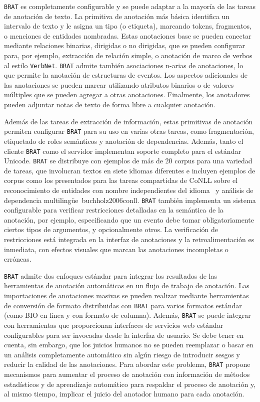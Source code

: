 \texttt{BRAT} es completamente configurable y se puede adaptar a la mayoría de las tareas de anotación de texto.
La primitiva de anotación más básica identifica un intervalo de texto y le asigna un tipo (o etiqueta), marcando tokens, fragmentos, o menciones de entidades nombradas.
Estas anotaciones base se pueden conectar mediante relaciones binarias, dirigidas o no dirigidas, que se pueden configurar para, por ejemplo, extracción de relación simple, o anotación de marco de verbos al estilo \texttt{VerbNet}.
\texttt{BRAT} admite también asociaciones n-arias de anotaciones, lo que permite la anotación de estructuras de eventos.
Los aspectos adicionales de las anotaciones se pueden marcar utilizando atributos binarios o de valores múltiples que se pueden agregar a otras anotaciones.
Finalmente, los anotadores pueden adjuntar notas de texto de forma libre a cualquier anotación.

Además de las tareas de extracción de información, estas primitivas de anotación permiten configurar \texttt{BRAT} para su uso en varias otras tareas, como fragmentación, etiquetado de roles semánticos y anotación de dependencias.
Además, tanto el cliente \texttt{BRAT} como el servidor implementan soporte completo para el estándar Unicode.
\texttt{BRAT} se distribuye con ejemplos de más de 20 corpus para una variedad de tareas, que involucran textos en siete idiomas diferentes e incluyen ejemplos de corpus como los presentados para las tareas compartidas de CoNLL sobre el reconocimiento de entidades con nombre independientes del idioma~\cite{sang2003ef} y análisis de dependencia multilingüe~{buchholz2006conll}.
\texttt{BRAT} también implementa un sistema configurable para verificar restricciones detalladas en la semántica de la anotación, por ejemplo, especificando que un evento debe tomar obligatoriamente ciertos tipos de argumentos, y opcionalmente otros.
La verificación de restricciones está integrada en la interfaz de anotaciones y la retroalimentación es inmediata, con efectos visuales que marcan las anotaciones incompletas o erróneas.

\texttt{BRAT} admite dos enfoques estándar para integrar los resultados de las herramientas de anotación automáticas en un flujo de trabajo de anotación.
Las importaciones de anotaciones masivas se pueden realizar mediante herramientas de conversión de formato distribuidas con \texttt{BRAT} para varios formatos estándar (como BIO en línea y con formato de columna).
Además, \texttt{BRAT} se puede integrar con herramientas que proporcionan interfaces de servicios web estándar configurables para ser invocadas desde la interfaz de usuario.
Se debe tener en cuenta, sin embargo, que los juicios humanos no se pueden reemplazar o basar en un análisis completamente automático sin algún riesgo de introducir sesgos y reducir la calidad de las anotaciones.
Para abordar este problema, \texttt{BRAT} propone mecanismos para aumentar el proceso de anotación con información de métodos estadísticos y de aprendizaje automático para respaldar el proceso de anotación y, al mismo tiempo, implicar el juicio del anotador humano para cada anotación.


